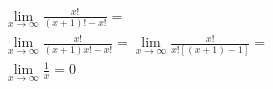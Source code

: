\begin{ex}
\begin{align}
&\lim_{x\rightarrow \infty} \frac{x!}{(x+1)!-x!}=\nonumber\\
&\lim_{x\rightarrow \infty} \frac{x!}{(x+1)x!-x!}=\lim_{x\rightarrow \infty} \frac{x!}{x![(x+1)-1]}=\nonumber\\
&\lim_{x\rightarrow \infty} \frac{1}{x}=0\nonumber
\end{align}
\end{ex}